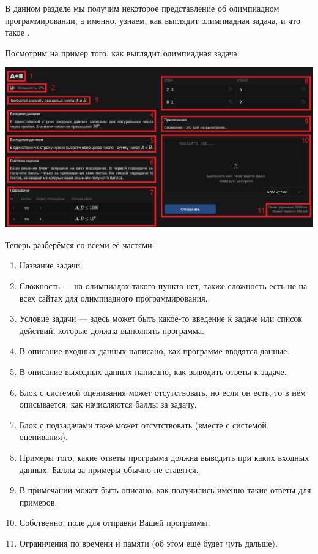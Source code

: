 В данном разделе мы получим некоторое представление об олимпиадном программировании, а именно, узнаем, как выглядит олимпиадная задача, и что такое .

Посмотрим на пример того, как выглядит олимпиадная задача:

\includegraphics[scale=0.66]{img/task.png}

Теперь разберёмся со всеми её частями:
\begin{enumerate}
    \item Название задачи.
    \item Сложность — на олимпиадах такого пункта нет, также сложность есть не на всех сайтах для олимпиадного программирования.
    \item Условие задачи — здесь может быть какое-то введение к задаче или список действий, которые должна выполнять программа. 
    \item В описание входных данных написано, как программе вводятся данные.
    \item В описание выходных данных написано, как выводить ответы к задаче.
    \item Блок с системой оценивания может отсутствовать, но если он есть, то в нём описывается, как начисляются баллы за задачу.
    \item Блок с подзадачами таже может отсутствовать (вместе с системой оценивания).
    \item Примеры того, какие ответы программа должна выводить при каких входных данных. Баллы за примеры обычно не ставятся.
    \item В примечании может быть описано, как получились именно такие ответы для примеров.
    \item Собственно, поле для отправки Вашей программы.
    \item Ограничения по времени и памяти (об этом ещё будет чуть дальше).
\end{enumerate}

